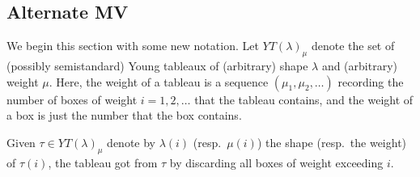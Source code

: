 \documentclass[draft]{article}
\begin{document}
\begin{comment}
\begin{lemma}%
    Let $\mu',\mu''$ be dominant and let $s\in \AA^1 - \{0\}$. Then 
    \begin{equation}
        S_{\mu',\mu''}^s \subset \cW_\mu 
    \end{equation}
    where $\mu = \mu_1 + \mu_2$.
\end{lemma}

\begin{proof}
    We have
\[
\begin{split}
    S_{\mu_1, \mu_2} & = N\xT[t^{-1}]t^{\mu_1}(t-s)^{\mu_2} \\
     & \subset T_1\xt[t^{-1}] N\xT[t^{-1}] t^{\mu_1} (t-s)^{\mu_2} \\
     & = T_1\xt[t^{-1}] N_1\xt[t^{-1}] t^{\mu_1} (t-s)^{\mu_2} \qquad \text{\cite[Lemma 2.3]{kamnitzer2014yangians}}\\
     & = B_1\xt[t^{-1}] t^{\mu_1} (t-s)^{\mu_2} \\
     & = B_1\xt[t^{-1}] t^{\mu_1 + \mu_2} \\
     & \subset G_1\xt[t^{-1}] t^{\mu_1 + \mu_2} \\
     & = W_{\mu_1 + \mu_2}
\end{split}
\]
where $B_1\xt[t^{-1}] t^{\mu_1} (t-s)^{\mu_2} = B_1\xt[t^{-1}] t^{\mu_1 + \mu_2}$ since 
\[
\frac{t}{t-s} = 
1 + \frac{s}{t} + \frac{s^2}{t^2} + \cdots 
\in B_1\xt[t^{-1}].
\]
\end{proof}
\end{comment}
% 
\subsection{Alternate MV}
We begin this section with some new notation. Let $YT(\lambda)_\mu$ denote the set of (possibly semistandard) Young tableaux of (arbitrary) shape $\lambda$ and (arbitrary) weight $\mu$. Here, the weight of a tableau is a sequence $(\mu_1,\mu_2,\dots)$ recording the number of boxes of weight $i = 1,2,\dots$ that the tableau contains, and the weight of a box is just the number that the box contains.

Given $\tau\in YT(\lambda)_\mu$ denote by $\lambda(i)$ (resp.\ $\mu(i)$) the shape (resp.\ the weight) of $\tau(i)$, the tableau got from $\tau$ by discarding all boxes of weight exceeding $i$. 
% 
\end{document}
